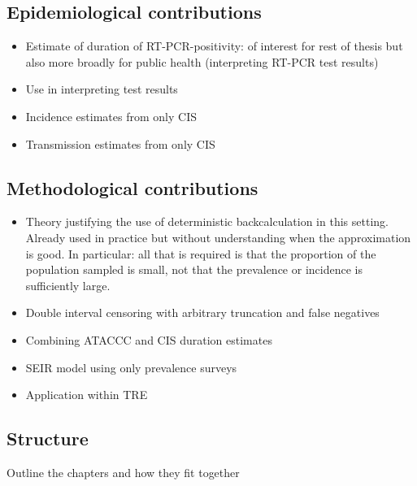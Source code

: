 \documentclass[thesis.tex]{subfiles}
\begin{document}
\subsection{Epidemiological contributions}

\begin{itemize}
    \item Estimate of duration of RT-PCR-positivity: of interest for rest of thesis but also more broadly for public health (\eg interpreting RT-PCR test results)
    \item Use in interpreting test results
    \item Incidence estimates from only CIS
    \item Transmission estimates from only CIS
\end{itemize}

\subsection{Methodological contributions}

\begin{itemize}
    \item Theory justifying the use of deterministic backcalculation in this setting. Already used in practice but without understanding when the approximation is good. In particular: all that is required is that the proportion of the population sampled is small, not that the prevalence or incidence is sufficiently large.
    \item Double interval censoring with arbitrary truncation and false negatives
    \item Combining ATACCC and CIS duration estimates
    \item SEIR model using only prevalence surveys
    \item Application within TRE
\end{itemize}

\subsection{Structure}

Outline the chapters and how they fit together
\end{document}
